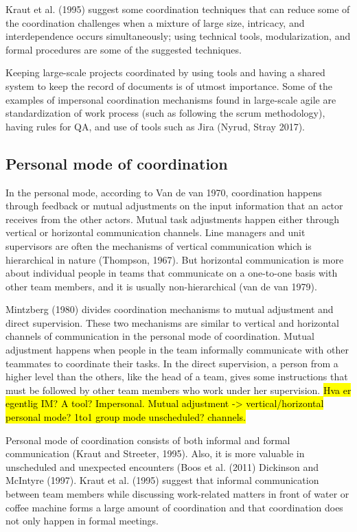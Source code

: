 Kraut et al. (1995) suggest some coordination techniques that can reduce some of the coordination challenges when a mixture of large size, intricacy, and interdependence occurs simultaneously;  using technical tools, modularization, and formal procedures are some of the suggested techniques.

Keeping large-scale projects coordinated by using tools and having a shared system to keep the record of documents is of utmost importance. Some of the examples of impersonal coordination mechanisms found in large-scale agile are standardization of work process (such as following the scrum methodology), having rules for QA, and use of tools such as Jira (Nyrud, Stray 2017).
\subsection{Personal mode of coordination}
In the personal mode, according to Van de van 1970, coordination happens through feedback or mutual adjustments on the input information that an actor receives from the other actors. Mutual task adjustments happen either through vertical or horizontal communication channels.
Line managers and unit supervisors are often the mechanisms of vertical communication which is hierarchical in nature (Thompson, 1967). But horizontal communication is more about individual people in teams that communicate on a one-to-one basis with other team members, and it is usually non-hierarchical (van de van 1979).

Mintzberg (1980) divides coordination mechanisms to mutual adjustment and direct supervision. These two mechanisms are similar to vertical and horizontal channels of communication in the personal mode of coordination. Mutual adjustment happens when people in the team informally communicate with other teammates to coordinate their tasks. In the direct supervision, a person from a higher level than the others, like the head of a team, gives some instructions that must be followed by other team members who work under her supervision.
\hl{Hva er egentlig IM? A tool? Impersonal. Mutual adjustment -> vertical/horizontal personal mode? 1to1 group mode unscheduled? channels.}

Personal mode of coordination consists of both informal and formal communication (Kraut and Streeter, 1995). Also, it is more valuable in unscheduled and unexpected encounters (Boos et al. (2011) Dickinson and McIntyre (1997). Kraut et al. (1995) suggest that informal communication between team members while discussing work-related matters in front of water or coffee machine forms a large amount of coordination and that coordination does not only happen in formal meetings.

